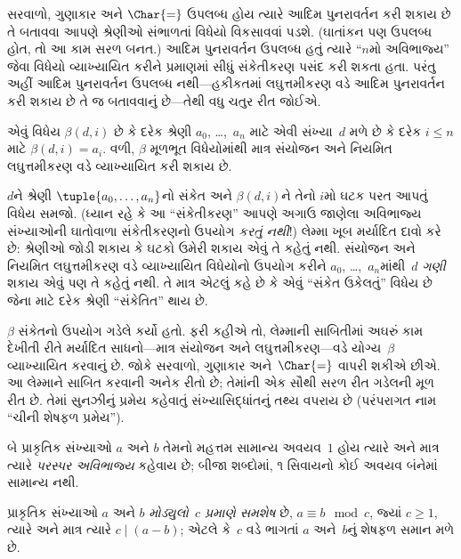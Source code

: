\documentclass[../../../include/open-logic-section]{subfiles}
\begin{document}


સરવાળો, ગુણાકાર અને $\Char{=}$
ઉપલબ્ધ હોય ત્યારે આદિમ પુનરાવર્તન
કરી શકાય છે તે બતાવવા આપણે શ્રેણીઓ
સંભાળતાં વિધેયો વિકસાવવાં પડશે.
(ઘાતાંકન પણ ઉપલબ્ધ હોત, તો આ કામ
સરળ બનત.) આદિમ પુનરાવર્તન
ઉપલબ્ધ હતું ત્યારે ``$n$મો
અવિભાજ્ય'' જેવા વિધેયો વ્યાખ્યાયિત
કરીને પ્રમાણમાં સીધું સંકેતીકરણ
પસંદ કરી શકતા હતા. પરંતુ અહીં
આદિમ પુનરાવર્તન ઉપલબ્ધ નથી—હકીકતમાં
લઘુત્તમીકરણ વડે આદિમ પુનરાવર્તન
કરી શકાય છે તે જ બતાવવાનું છે—તેથી
વધુ ચતુર રીત જોઈએ.

\begin{lem}
એવું વિધેય $\beta(d,i)$ છે કે
દરેક શ્રેણી $a_0$, \dots,~$a_n$
માટે એવી સંખ્યા~$d$ મળે છે કે
દરેક $i \le n$ માટે
$\beta(d,i) = a_i$. વળી, $\beta$
મૂળભૂત વિધેયોમાંથી માત્ર સંયોજન
અને નિયમિત લઘુત્તમીકરણ વડે
વ્યાખ્યાયિત કરી શકાય છે.
\end{lem}

$d$ને શ્રેણી $\tuple{a_0, \dots,
a_n}$નો સંકેત અને $\beta(d,i)$ને
તેનો $i$મો ઘટક પરત આપતું વિધેય
સમજો. (ધ્યાન રહે કે આ
``સંકેતીકરણ'' આપણે અગાઉ જાણેલા
અવિભાજ્ય સંખ્યાઓની ઘાતોવાળા સંકેતીકરણનો
ઉપયોગ \emph{કરતું નથી}!) લેમ્મા
ખૂબ મર્યાદિત દાવો કરે છે: શ્રેણીઓ
જોડી શકાય કે ઘટકો ઉમેરી શકાય
એવું તે કહેતું નથી. સંયોજન અને
નિયમિત લઘુત્તમીકરણ વડે વ્યાખ્યાયિત
વિધેયોનો ઉપયોગ કરીને $a_0$,
\dots,~$a_n$માંથી~$d$ \emph{ગણી}
શકાય એવું પણ તે કહેતું નથી.
તે માત્ર એટલું કહે છે કે એવું
``સંકેત ઉકેલતું'' વિધેય છે જેના માટે
દરેક શ્રેણી ``સંકેતિત'' થાય છે.

$\beta$ સંકેતનો ઉપયોગ ગડેલે કર્યો
હતો. ફરી કહીએ તો, લેમ્માની
સાબિતીમાં અઘરું કામ દેખીતી રીતે
મર્યાદિત સાધનો—માત્ર સંયોજન અને
લઘુત્તમીકરણ—વડે યોગ્ય~$\beta$
વ્યાખ્યાયિત કરવાનું છે. જોકે સરવાળો,
ગુણાકાર અને~$\Char{=}$ વાપરી
શકીએ છીએ. આ લેમ્માને સાબિત
કરવાની અનેક રીતો છે; તેમાંની એક
સૌથી સરળ રીત ગડેલની મૂળ રીત છે.
તેમાં સુનઝીનું પ્રમેય કહેવાતું
સંખ્યાસિદ્ધાંતનું તથ્ય વપરાય છે
(પરંપરાગત નામ ``ચીની શેષફળ પ્રમેય'').

\begin{defn}
બે પ્રાકૃતિક સંખ્યાઓ $a$ અને $b$
તેમનો મહત્તમ સામાન્ય અવયવ~$1$
હોય ત્યારે અને માત્ર ત્યારે
\emph{પરસ્પર અવિભાજ્ય} કહેવાય છે;
બીજા શબ્દોમાં, ૧ સિવાયનો
કોઈ અવયવ બંનેમાં સામાન્ય નથી.
\end{defn}

\begin{defn}
પ્રાકૃતિક સંખ્યાઓ $a$ અને $b$
\emph{મોડ્યુલો~$c$ પ્રમાણે સમશેષ}
છે, $a \equiv b \mod c$, જ્યાં $c\geq1$, ત્યારે
અને માત્ર ત્યારે $c \mid (a-b)$;
એટલે કે~$c$ વડે ભાગતાં
$a$ અને~$b$નું
શેષફળ સમાન મળે છે.
\end{defn}
\end{document}
